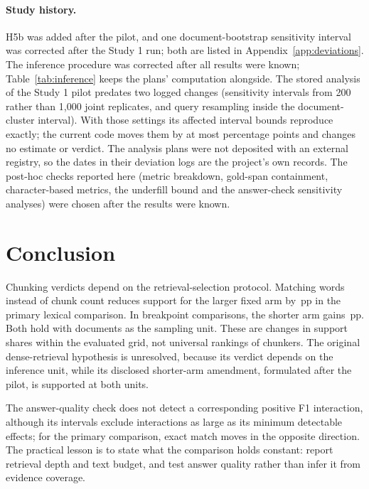 \documentclass[11pt]{article}
\newcommand{\pp}{\ensuremath{\,\mathrm{pp}}}
\begin{document}
\paragraph{Study history.}
H5b was added after the pilot, and one document-bootstrap sensitivity interval was corrected after the Study 1 run; both are listed in Appendix~\ref{app:deviations}. The inference procedure was corrected after all results were known; Table~\ref{tab:inference} keeps the plans' computation alongside. The stored analysis of the Study 1 pilot predates two logged changes (sensitivity intervals from 200 rather than 1,000 joint replicates, and query resampling inside the document-cluster interval). With those settings its \PilotBounds{} affected interval bounds reproduce exactly; the current code moves them by at most \PilotMaxDiff{} percentage points and changes no estimate or verdict. The analysis plans were not deposited with an external registry, so the dates in their deviation logs are the project's own records. The post-hoc checks reported here (metric breakdown, gold-span containment, character-based metrics, the underfill bound and the answer-check sensitivity analyses) were chosen after the results were known.

\section{Conclusion}
Chunking verdicts depend on the retrieval-selection protocol. Matching words instead of chunk count reduces support for the larger fixed arm by \HOneEst\pp{} in the primary lexical comparison. In breakpoint comparisons, the shorter arm gains \HFourEst\pp{}. Both hold with documents as the sampling unit. These are changes in support shares within the evaluated grid, not universal rankings of chunkers. The original dense-retrieval hypothesis is unresolved, because its verdict depends on the inference unit, while its disclosed shorter-arm amendment, formulated after the pilot, is supported at both units.

The answer-quality check does not detect a corresponding positive F1 interaction, although its intervals exclude interactions as large as its minimum detectable effects; for the primary comparison, exact match moves in the opposite direction. The practical lesson is to state what the comparison holds constant: report retrieval depth and text budget, and test answer quality rather than infer it from evidence coverage.
\end{document}
